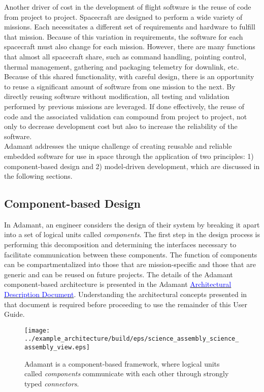 Another driver of cost in the development of flight software is the reuse of code from project to project. Spacecraft are designed to perform a wide variety of missions. Each necessitates a different set of requirements and hardware to fulfill that mission. Because of this variation in requirements, the software for each spacecraft must also change for each mission. However, there are many functions that almost all spacecraft share, such as command handling, pointing control, thermal management, gathering and packaging telemetry for downlink, etc. Because of this shared functionality, with careful design, there is an opportunity to reuse a significant amount of software from one mission to the next. By directly reusing software without modification, all testing and validation performed by previous missions are leveraged. If done effectively, the reuse of code and the associated validation can compound from project to project, not only to decrease development cost but also to increase the reliability of the software. \\

Adamant addresses the unique challenge of creating reusable and reliable embedded software for use in space through the application of two principles: 1) component-based design and 2) model-driven development, which are discussed in the following sections.

\subsection{Component-based Design}

In Adamant, an engineer considers the design of their system by breaking it apart into a set of logical units called \textit{components}. The first step in the design process is performing this decomposition and determining the interfaces necessary to facilitate communication between these components. The function of components can be compartmentalized into those that are mission-specific and those that are generic and can be reused on future projects. The details of the Adamant component-based architecture is presented in the Adamant \href{https://github.com/lasp/adamant/blob/main/doc/architecture_description_document/architecture_description_document.pdf}{\textcolor{blue}{Architectural Description Document}}. Understanding the architectural concepts presented in that document is required before proceeding to use the remainder of this User Guide.

\begin{figure}[H]
  \texttt{[image: ../example\_architecture/build/eps/science\_assembly\_science\_assembly\_view.eps]}
  \caption{Adamant is a component-based framework, where logical units called \textit{components} communicate with each other through strongly typed \textit{connectors}.}
\end{figure}

